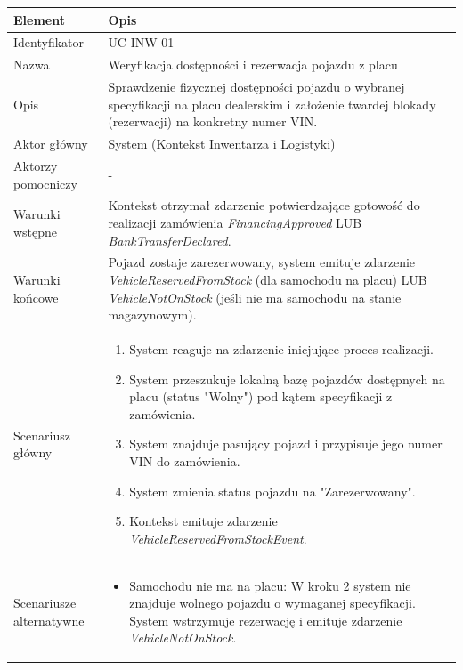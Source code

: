 \begin{longtable}{|p{4cm}|p{11cm}|}
\hline
\textbf{Element} & \textbf{Opis} \\
\hline

Identyfikator & UC-INW-01 \\
\hline

Nazwa & Weryfikacja dostępności i rezerwacja pojazdu z placu \\
\hline

Opis & 
Sprawdzenie fizycznej dostępności pojazdu o wybranej specyfikacji na placu dealerskim i założenie twardej blokady (rezerwacji) na konkretny numer VIN. \\
\hline

Aktor główny & System (Kontekst Inwentarza i Logistyki) \\
\hline

Aktorzy pomocniczy & - \\
\hline

Warunki wstępne & 
Kontekst otrzymał zdarzenie potwierdzające gotowość do realizacji zamówienia \textit{FinancingApproved} LUB \textit{BankTransferDeclared}. \\
\hline

Warunki końcowe & 
Pojazd zostaje zarezerwowany, system emituje zdarzenie \textit{VehicleReservedFromStock} (dla samochodu na placu) LUB \textit{VehicleNotOnStock} (jeśli nie ma samochodu na stanie magazynowym). \\
\hline

Scenariusz główny & 
\begin{enumerate}
    \item System reaguje na zdarzenie inicjujące proces realizacji.
    \item System przeszukuje lokalną bazę pojazdów dostępnych na placu (status "Wolny") pod kątem specyfikacji z zamówienia.
    \item System znajduje pasujący pojazd i przypisuje jego numer VIN do zamówienia.
    \item System zmienia status pojazdu na "Zarezerwowany".
    \item Kontekst emituje zdarzenie \textit{VehicleReservedFromStockEvent}.
\end{enumerate} \\
\hline

Scenariusze alternatywne & 
\begin{itemize}
    \item [A1] Samochodu nie ma na placu: W kroku 2 system nie znajduje wolnego pojazdu o wymaganej specyfikacji. System wstrzymuje rezerwację i emituje zdarzenie \textit{VehicleNotOnStock}.
\end{itemize} \\
\hline
\end{longtable}

